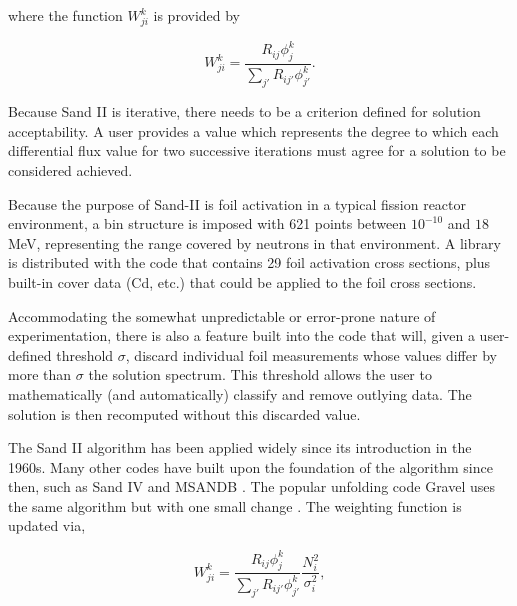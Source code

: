 \noindent
where the function $W_{ji}^k$ is provided by

\begin{equation}
\label{eqn:sandii-w}
W_{ji}^k = \frac{R_{ij} \phi_{j}^k}{\sum_{j'} R_{ij'} \phi_{j'}^k} .
\end{equation}

Because Sand II is iterative, there needs to be a criterion defined for solution acceptability.
A user provides a value which represents the degree to which each differential flux value for two successive iterations must agree for a solution to be considered achieved.

Because the purpose of Sand-II is foil activation in a typical fission reactor environment, a bin structure is imposed with 621 points between $10^{-10}$ and $18$ MeV, representing the range covered by neutrons in that environment.
A library is distributed with the code that contains 29 foil activation cross sections, plus built-in cover data (Cd, etc.) that could be applied to the foil cross sections.

Accommodating the somewhat unpredictable or error-prone nature of experimentation, there is also a feature built into the code that will, given a user-defined threshold $\sigma$, discard individual foil measurements whose values differ by more than $\sigma$ the solution spectrum.
This threshold allows the user to mathematically (and automatically) classify and remove outlying data.
The solution is then recomputed without this discarded value.

The Sand II algorithm has been applied widely since its introduction in the 1960s.
Many other codes have built upon the foundation of the algorithm since then, such as Sand IV and MSANDB \cite{simmer2010iterative}.
The popular unfolding code Gravel uses the same algorithm but with one small change \cite{reginatto2004umg}.
The weighting function is updated via,

\begin{equation}
\label{eqn:gravel-w}
W_{ji}^k = \frac{R_{ij} \phi_{j}^k}{\sum_{j'} R_{ij'} \phi_{j'}^k} \frac{N_i^2}{\sigma_i^2} ,
\end{equation}

